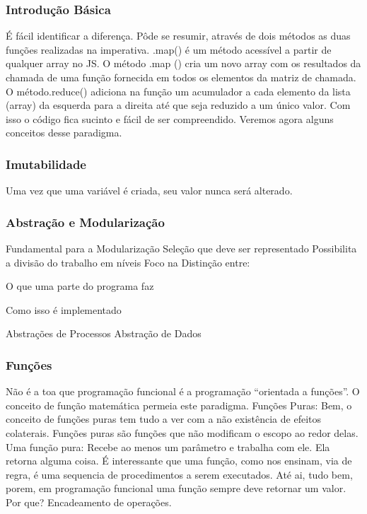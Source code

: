 \documentclass{beamer}
\begin{document}
\begin{frame}
\frametitle{Introdução Básica}
É fácil identificar a diferença. Pôde se resumir, através de dois métodos as duas funções realizadas na imperativa. .map() é um método acessível a partir de qualquer array no JS. O método .map () cria um novo array com os resultados da chamada de uma função fornecida em todos os elementos da matriz de chamada. O método.reduce() adiciona na função um acumulador a cada elemento da lista (array) da esquerda para a direita até que seja reduzido a um único valor. 
Com isso o código fica sucinto e fácil de ser compreendido. 
\newline Veremos agora alguns conceitos desse paradigma. 


\end{frame}


\begin{frame}
\frametitle{Imutabilidade}
Uma vez que uma variável é criada, seu valor nunca será alterado.
\end{frame}

\begin{frame}
\frametitle{Abstração e Modularização}
Fundamental para a Modularização
\newline Seleção que deve ser representado
\newline Possibilita a divisão do trabalho em níveis
\newline Foco na Distinção entre:
\centerline{O que uma parte do programa faz}
\centerline{Como isso é implementado}
\newline \newline Abstrações de Processos
\newline \newline Abstração de Dados

\end{frame}
\begin{frame}
\frametitle{Funções}
Não é a toa que programação funcional é a programação “orientada a funções”. O conceito de função matemática permeia este paradigma.
\newline Funções Puras: Bem, o conceito de funções puras tem tudo a ver com a não existência de efeitos colaterais. Funções puras são funções que não modificam o escopo ao redor delas.
\newline
\newline Uma função pura: Recebe ao menos um parâmetro e trabalha com ele.
Ela retorna alguma coisa. É interessante que uma função, como nos ensinam, via de regra, é uma sequencia de procedimentos a serem executados. Até ai, tudo bem, porem, em programação funcional uma função sempre deve retornar um valor. 
\newline Por que? Encadeamento de operações. 

\end{frame}
\end{document}
